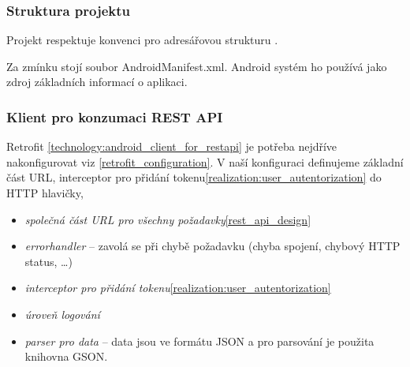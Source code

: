 \documentclass[thesis=B,czech]{FITthesis}[2012/06/26]
\begin{document}
\subsubsection{Struktura projektu}

Projekt respektuje konvenci pro adresářovou strukturu \cite{realization_androi_project_structure}.

\begin{figure}[h!]
\end{figure}

Za zmínku stojí soubor AndroidManifest.xml. Android systém ho používá jako zdroj základních informací o aplikaci\cite{realization_androi_manifest}. 

\subsubsection{Klient pro konzumaci REST API}

Retrofit \ref{technology:android_client_for_restapi} je potřeba nejdříve nakonfigurovat viz \ref{retrofit_configuration}. V naší konfiguraci definujeme základní část URL, interceptor pro přidání tokenu\ref{realization:user_autentorization} do HTTP hlavičky,
\begin{itemize}[nosep]
	\item \textit{společná část URL pro všechny požadavky}\ref{rest_api_design} 
	\item \textit{errorhandler} -- zavolá se při chybě požadavku (chyba spojení, chybový HTTP status\cite{http_statuses}, \dots)
	\item \textit{interceptor pro přidání tokenu}\ref{realization:user_autentorization}
	\item \textit{úroveň logování}
	\item \textit{parser pro data} -- data jsou ve formátu JSON a pro parsování je použita knihovna GSON\cite{retrofit_gson}.
\end{itemize}


\end{document}
